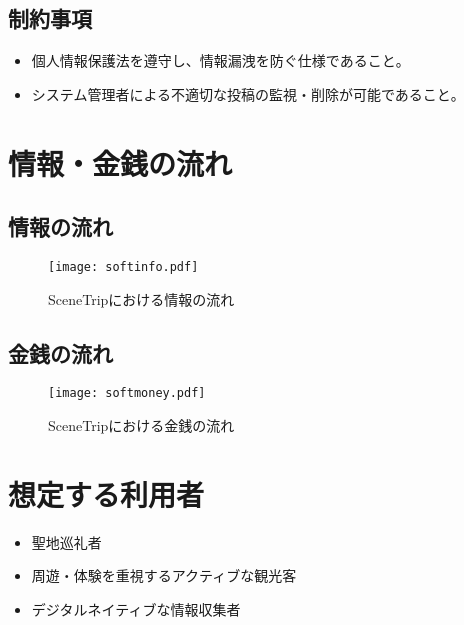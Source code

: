 \documentclass{docs}
\begin{document}
\subsection{制約事項}
\begin{itemize}
	\item 個人情報保護法を遵守し、情報漏洩を防ぐ仕様であること。
	\item システム管理者による不適切な投稿の監視・削除が可能であること。
\end{itemize}

\section{情報・金銭の流れ}
\subsection{情報の流れ}
\begin{figure}[H]
	\centering
	\texttt{[image: softinfo.pdf]}
	\caption{SceneTripにおける情報の流れ}\label{fig:info}
\end{figure}

\subsection{金銭の流れ}
\begin{figure}[H]
	\centering
	\texttt{[image: softmoney.pdf]}
	\caption{SceneTripにおける金銭の流れ}\label{fig:money}
\end{figure}


\section{想定する利用者}
\begin{itemize}
	\item 聖地巡礼者
	\item 周遊・体験を重視するアクティブな観光客
	\item デジタルネイティブな情報収集者
\end{itemize}
\end{document}
